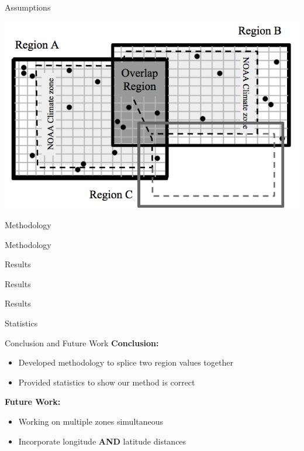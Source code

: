 \documentclass{beamer}
\begin{document}
\begin{frame}{Assumptions}
\vspace{-5mm}
\begin{center}
\includegraphics[width=1.0\textwidth]{overlap.png}
\end{center}
\end{frame}

\begin{frame}{Methodology}

\end{frame}

\begin{frame}{Methodology}

\end{frame}


\begin{frame}{Results}

\end{frame}

\begin{frame}{Results}

\end{frame}

\begin{frame}{Results}

\end{frame}

\begin{frame}{Statistics}

\end{frame}

\begin{frame}{Conclusion and Future Work}
	\vspace{-3em}
\textbf{Conclusion:}
\begin{itemize}
\item Developed methodology to splice two region values together
\item Provided statistics to show our method is correct
\end{itemize}
\vspace{9mm}
\textbf{Future Work:}
\begin{itemize}
\item Working on multiple zones simultaneous
\item Incorporate longitude \textbf{AND} latitude distances
\end{itemize}

\end{frame}
\end{document}
